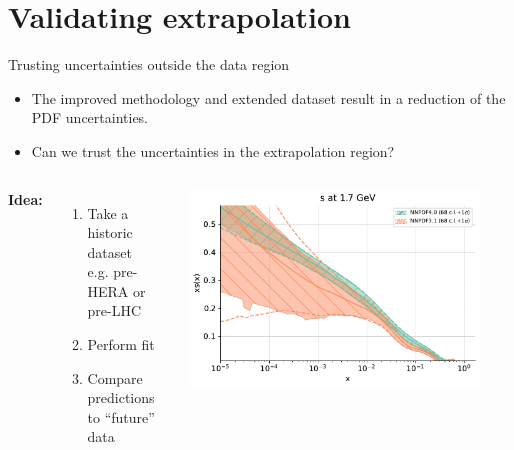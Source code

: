 \documentclass[aspectratio=169,10pt]{beamer}
\begin{document}
\section*{Validating extrapolation}

\begin{frame}{Trusting uncertainties outside the data region}

\begin{itemize}
        \item The improved methodology and extended dataset result in a reduction of the PDF uncertainties.
        \item Can we trust the uncertainties in the extrapolation region?
\end{itemize}

\begin{columns}
    \textbf{Idea:}
    \begin{enumerate}
    \item Take a historic dataset \\ e.g. pre-HERA or pre-LHC
    \item Perform fit
    \item Compare predictions to ``future'' data
    \end{enumerate}

     \includegraphics[width=0.9\textwidth]{future_test/NNPDF31_vs_NNPDF40}
\end{columns}
\end{frame}
\end{document}

